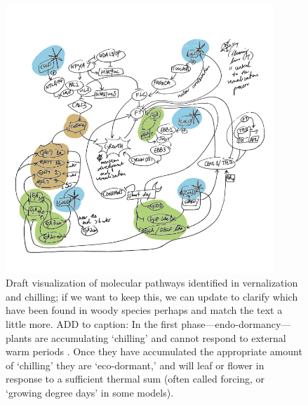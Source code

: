 \documentclass[11pt]{article}
\begin{document}
\begin{figure}[h!]
\includegraphics[width=0.9\textwidth]{..//figures/biochemicalModelSketch.png}
\caption{Draft visualization of molecular pathways identified in vernalization and chilling; if we want to keep this, we can update to clarify which have been found in woody species perhaps and match the text a little more. ADD to caption: In the first phase---endo-dormancy---plants are accumulating `chilling' and cannot respond to external warm periods  \citep[thus the `endo' part of the term,][]{chuine2016,lundell2020}. Once they have accumulated the appropriate amount of `chilling' they are `eco-dormant,' and will leaf or flower in response to a sufficient thermal sum (often called forcing, or `growing degree days' in some models). } 
\label{fig:molecular}
\end{figure}
\end{document}
